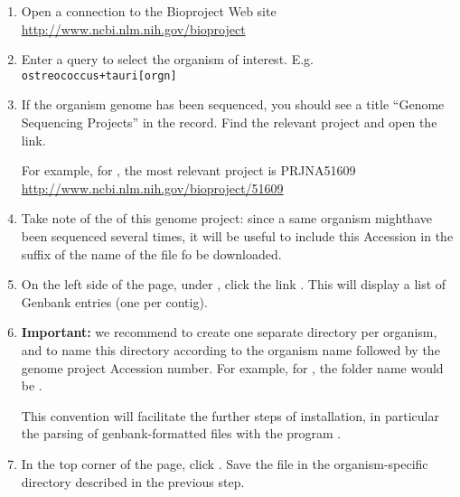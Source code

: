 \begin{enumerate}
\item Open a connection to the Bioproject Web site \\
  \url{http://www.ncbi.nlm.nih.gov/bioproject}

\item Enter a query to select the organism of interest.
  E.g. \texttt{ostreococcus+tauri[orgn]}

\item If the organism genome has been sequenced, you should see a
  title ``Genome Sequencing Projects'' in the record. Find the
  relevant project and open the link.

  For example, for
  , the most relevant project is PRJNA51609 \\
  \url{http://www.ncbi.nlm.nih.gov/bioproject/51609}

\item Take note of the  of this genome project:
  since a same organism mighthave been sequenced several times, it
  will be useful to include this Accession in the suffix of the name
  of the file fo be downloaded.

\item On the left side of the page, under , click the link . This will display a list of Genbank entries (one per contig).


\item \textbf{Important:} we recommend to create one separate
  directory per organism, and to name this directory according to the
  organism name followed by the genome project Accession number. For
  example, for , the folder name would be
  .

  This convention will facilitate the further steps of installation,
  in particular the parsing of genbank-formatted files with the
  program .

\item In the top corner of the page, click . Save the file in the
  organism-specific directory described in the previous step.

\end{enumerate}

